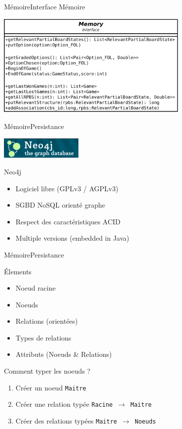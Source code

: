 \begin{frame}{Mémoire}{Interface Mémoire}
\begin{center}
\includegraphics[width=0.7\textwidth]{img/implementation_memory/interface}
\end{center}
\end{frame}

\begin{frame}{Mémoire}{Persistance}
\begin{center}
\includegraphics[width=0.3\textwidth]{img/neo4j/neo4j_logo}
\end{center}
\begin{block}{Neo4j}
\begin{itemize}
\item Logiciel libre (GPLv3 / AGPLv3)
\item SGBD NoSQL orienté graphe
\item Respect des caractéristiques ACID
\item Multiple versions (embedded in Java)
\end{itemize}
\end{block}
\end{frame}

\begin{frame}{Mémoire}{Persistance}
\begin{block}{Élements}
\begin{itemize}
\item Noeud racine
\item Noeuds
\item Relations (orientées)
\item Types de relations
\item Attributs (Noeuds \& Relations)
\end{itemize}
\end{block}
\begin{block}{Comment typer les noeuds ?}
\begin{enumerate}
\item Créer un noeud \texttt{Maitre}
\item Créer une relation typée \texttt{Racine $\rightarrow$ Maitre}
\item Créer des relations typées \texttt{Maitre $\rightarrow$ Noeuds}
\end{enumerate}
\end{block}
\end{frame}